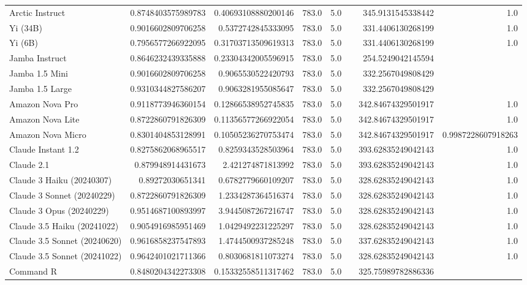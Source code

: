 \begin{table}[htp]
{\begin{tabular}{lrrrrrrr}
Arctic Instruct & 0.8748403575989783 & 0.40693108880200146 & 783.0 & 5.0 &  & 345.9131545338442 & 1.0 \\
Yi (34B) & 0.9016602809706258 & 0.5372742845333095 & 783.0 & 5.0 &  & 331.4406130268199 & 1.0 \\
Yi (6B) & 0.7956577266922095 & 0.31703713509619313 & 783.0 & 5.0 &  & 331.4406130268199 & 1.0 \\
Jamba Instruct & 0.8646232439335888 & 0.23304342005596915 & 783.0 & 5.0 &  & 254.5249042145594 &  \\
Jamba 1.5 Mini & 0.9016602809706258 & 0.9065530522420793 & 783.0 & 5.0 &  & 332.2567049808429 &  \\
Jamba 1.5 Large & 0.9310344827586207 & 0.9063281955085647 & 783.0 & 5.0 &  & 332.2567049808429 &  \\
Amazon Nova Pro & 0.9118773946360154 & 0.12866538952745835 & 783.0 & 5.0 &  & 342.84674329501917 & 1.0 \\
Amazon Nova Lite & 0.8722860791826309 & 0.11356577266922054 & 783.0 & 5.0 &  & 342.84674329501917 & 1.0 \\
Amazon Nova Micro & 0.8301404853128991 & 0.10505236270753474 & 783.0 & 5.0 &  & 342.84674329501917 & 0.9987228607918263 \\
Claude Instant 1.2 & 0.8275862068965517 & 0.8259343528503964 & 783.0 & 5.0 &  & 393.62835249042143 & 1.0 \\
Claude 2.1 & 0.879948914431673 & 2.421274871813992 & 783.0 & 5.0 &  & 393.62835249042143 & 1.0 \\
Claude 3 Haiku (20240307) & 0.89272030651341 & 0.6782779660109207 & 783.0 & 5.0 &  & 328.62835249042143 & 1.0 \\
Claude 3 Sonnet (20240229) & 0.8722860791826309 & 1.2334287364516374 & 783.0 & 5.0 &  & 328.62835249042143 & 1.0 \\
Claude 3 Opus (20240229) & 0.9514687100893997 & 3.9445087267216747 & 783.0 & 5.0 &  & 328.62835249042143 & 1.0 \\
Claude 3.5 Haiku (20241022) & 0.9054916985951469 & 1.0429492231225297 & 783.0 & 5.0 &  & 328.62835249042143 & 1.0 \\
Claude 3.5 Sonnet (20240620) & 0.9616858237547893 & 1.4744500937285248 & 783.0 & 5.0 &  & 337.62835249042143 & 1.0 \\
Claude 3.5 Sonnet (20241022) & 0.9642401021711366 & 0.8030681811073274 & 783.0 & 5.0 &  & 328.62835249042143 & 1.0 \\
Command R & 0.8480204342273308 & 0.15332558511317462 & 783.0 & 5.0 &  & 325.75989782886336 &  \\

\end{tabular}}
\end{table}
